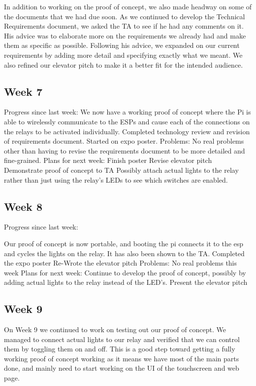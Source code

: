 \documentclass[letterpaper,10pt]{article}
\begin{document}
In addition to working on the proof of concept, we also made headway on some of the documents that we had due soon. As we continued to develop the Technical Requirements document, we asked the TA to see if he had any comments on it. His advice was to elaborate more on the requirements we already had and make them as specific as possible. Following his advice, we expanded on our current requirements by adding more detail and specifying exactly what we meant. We also refined our elevator pitch to make it a better fit for the intended audience.

\subsection{Week 7}

Progress since last week: 
We now have a working proof of concept where the Pi is able to wirelessly communicate to the ESPs and cause each of the connections on the relays to be activated individually. 
Completed technology review and revision of requirements document. 
Started on expo poster. 
Problems: 
No real problems other than having to revise the requirements document to be more detailed and fine-grained. 
Plans for next week: 
Finish poster 
Revise elevator pitch 
Demonstrate proof of concept to TA 
Possibly attach actual lights to the relay rather than just using the relay's LEDs to see which switches are enabled. 

\subsection{Week 8}
 
Progress since last week: 
 
Our proof of concept is now portable, and booting the pi connects it to the esp and cycles the lights on the relay. It has also been shown to the TA. 
Completed the expo poster 
Re-Wrote the elevator pitch 
Problems: 
No real problems this week 
Plans for next week: 
Continue to develop the proof of concept, possibly by adding actual lights to the relay instead of the LED's. 
Present the elevator pitch 

\subsection{Week 9}
 
On Week 9 we continued to work on testing out our proof of concept. We managed to connect actual lights to our relay and verified that we can control them by toggling them on and off. This is a good step toward getting a fully working proof of concept working as it means we have most of the main parts done, and mainly need to start working on the UI of the touchscreen and web page.
\end{document}
